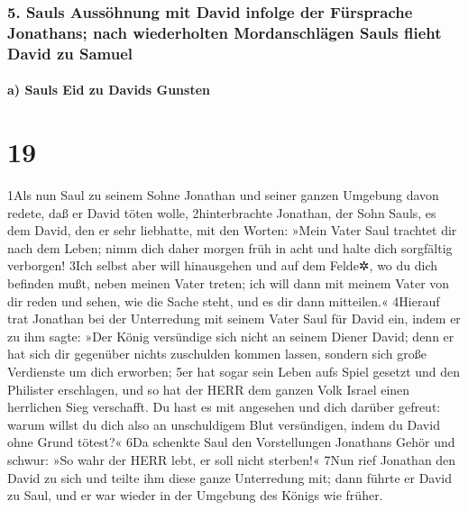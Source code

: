 \hypertarget{sauls-aussuxf6hnung-mit-david-infolge-der-fuxfcrsprache-jonathans-nach-wiederholten-mordanschluxe4gen-sauls-flieht-david-zu-samuel}{%
\subsubsection{5. Sauls Aussöhnung mit David infolge der Fürsprache
Jonathans; nach wiederholten Mordanschlägen Sauls flieht David zu
Samuel}\label{sauls-aussuxf6hnung-mit-david-infolge-der-fuxfcrsprache-jonathans-nach-wiederholten-mordanschluxe4gen-sauls-flieht-david-zu-samuel}}

\hypertarget{a-sauls-eid-zu-davids-gunsten}{%
\paragraph{a) Sauls Eid zu Davids
Gunsten}\label{a-sauls-eid-zu-davids-gunsten}}

\hypertarget{section-18}{%
\section{19}\label{section-18}}

1Als nun Saul zu seinem Sohne Jonathan und seiner ganzen Umgebung davon
redete, daß er David töten wolle, 2hinterbrachte Jonathan, der Sohn
Sauls, es dem David, den er sehr liebhatte, mit den Worten: »Mein Vater
Saul trachtet dir nach dem Leben; nimm dich daher morgen früh in acht
und halte dich sorgfältig verborgen! 3Ich selbst aber will hinausgehen
und auf dem Felde✲, wo du dich befinden mußt, neben meinen Vater treten;
ich will dann mit meinem Vater von dir reden und sehen, wie die Sache
steht, und es dir dann mitteilen.« 4Hierauf trat Jonathan bei der
Unterredung mit seinem Vater Saul für David ein, indem er zu ihm sagte:
»Der König versündige sich nicht an seinem Diener David; denn er hat
sich dir gegenüber nichts zuschulden kommen lassen, sondern sich große
Verdienste um dich erworben; 5er hat sogar sein Leben aufs Spiel gesetzt
und den Philister erschlagen, und so hat der HERR dem ganzen Volk Israel
einen herrlichen Sieg verschafft. Du hast es mit angesehen und dich
darüber gefreut: warum willst du dich also an unschuldigem Blut
versündigen, indem du David ohne Grund tötest?« 6Da schenkte Saul den
Vorstellungen Jonathans Gehör und schwur: »So wahr der HERR lebt, er
soll nicht sterben!« 7Nun rief Jonathan den David zu sich und teilte ihm
diese ganze Unterredung mit; dann führte er David zu Saul, und er war
wieder in der Umgebung des Königs wie früher.

